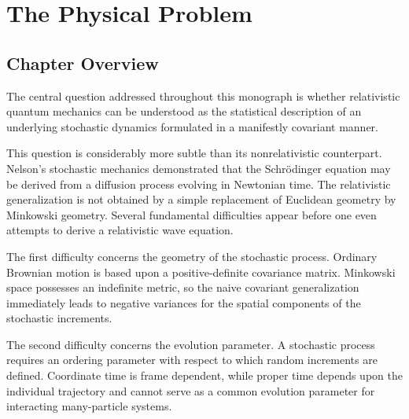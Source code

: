 
\chapter{The Physical Problem}


\section{Chapter Overview}

The central question addressed throughout this monograph is whether
relativistic quantum mechanics can be understood as the statistical
description of an underlying stochastic dynamics formulated in a
manifestly covariant manner.

This question is considerably more subtle than its nonrelativistic
counterpart. Nelson's stochastic mechanics demonstrated that the
Schrödinger equation may be derived from a diffusion process evolving in
Newtonian time. The relativistic generalization is not obtained by a
simple replacement of Euclidean geometry by Minkowski geometry. Several
fundamental difficulties appear before one even attempts to derive a
relativistic wave equation.

The first difficulty concerns the geometry of the stochastic process.
Ordinary Brownian motion is based upon a positive-definite covariance
matrix. Minkowski space possesses an indefinite metric, so the naive
covariant generalization immediately leads to negative variances for the
spatial components of the stochastic increments.

The second difficulty concerns the evolution parameter. A stochastic
process requires an ordering parameter with respect to which random
increments are defined. Coordinate time is frame dependent, while proper
time depends upon the individual trajectory and cannot serve as a common
evolution parameter for interacting many-particle systems.

